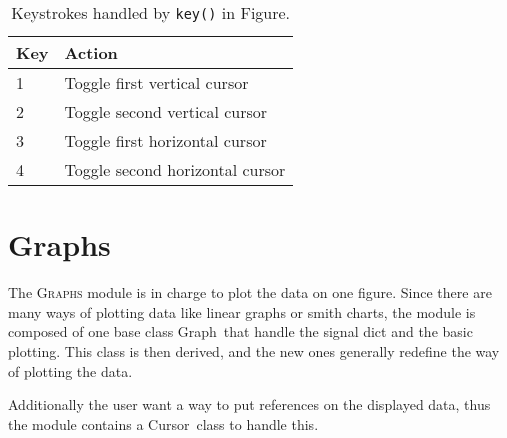 \documentclass[a4paper,11pt]{article}
\newcommand{\meth}[1]{\texttt{#1()}}
\newcommand{\cls}[1]{\textsf{#1}}
\newcommand{\module}[1]{\textsc{#1}}
\newcommand{\graph}{\cls{Graph}}
\newcommand{\fig}{\cls{Figure}}
\newcommand{\cursor}{\cls{Cursor}}
\begin{document}
\begin{table}[htbp]
  \centering\small\sf
  \begin{tabular}{ll}
    \hline
    Key & Action \\
    \hline
    1  & Toggle first vertical cursor \\
    2  & Toggle second vertical cursor \\
    3  & Toggle first horizontal cursor \\
    4  & Toggle second horizontal cursor \\
    \hline
  \end{tabular}
  \caption{Keystrokes handled by \meth{key} in \fig.}
  \label{tab:figs:key}
\end{table}

\section{Graphs}
\label{sec:graphs}
The \module{Graphs} module is in charge to plot the data on one figure.
Since there are many ways of plotting data like linear graphs or smith charts, the module is composed of one base class \graph\ that handle the signal dict and the basic plotting.
This class is then derived, and the new ones generally redefine the way of plotting the data.

Additionally the user want a way to put references on the displayed data, thus the module contains a \cursor\ class to handle this.
\end{document}
